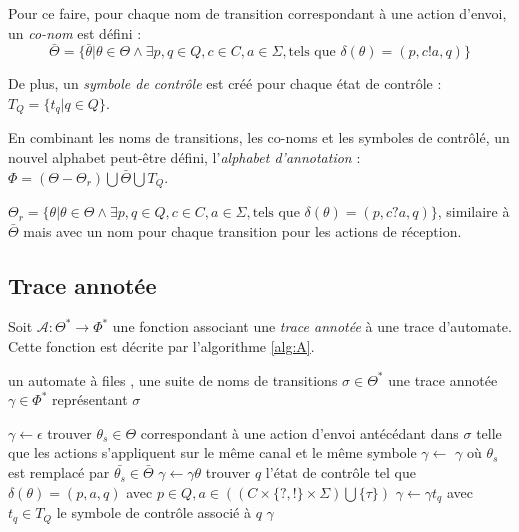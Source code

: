 Pour ce faire, pour chaque nom de transition correspondant à une action d'envoi, un \emph{co-nom} est défini :
$$
\bar{\Theta}=\{\bar{\theta}|\theta\in\Theta\wedge\exists p,q \in Q, c\in C, a\in\Sigma,\text{tels que } \delta(\theta)=(p,c!a,q)\}
$$

De plus, un \emph{symbole de contrôle} est créé pour chaque état de contrôle : $T_Q = \{t_q | q\in Q\}$.

En combinant les noms de transitions, les co-noms et les symboles de contrôlé, un nouvel alphabet peut-être défini, l'\emph{alphabet d'annotation} : $\Phi=(\Theta-\Theta_r)\bigcup\bar{\Theta}\bigcup T_Q$.

$\Theta_r=\{\theta|\theta\in\Theta\wedge\exists p,q \in Q, c\in C, a\in\Sigma,\text{tels que } \delta(\theta)=(p,c?a,q)\}$, similaire à $\bar{\Theta}$ mais avec un nom pour chaque transition pour les actions de réception.


\subsection{Trace annotée}


Soit $\mathcal{A}:\Theta^*\rightarrow\Phi^*$ une fonction associant une \emph{trace annotée} à une trace d'automate. Cette fonction est décrite par l'algorithme \ref{alg:A}.

\begin{algorithm}[H]
  	\begin{algorithmic}[1]
    \REQUIRE un automate à files \fifo , une suite de noms de transitions $\sigma\in\Theta^*$
		\ENSURE une trace annotée $\gamma\in\Phi^*$ représentant $\sigma$

    \STATE $\gamma\leftarrow\epsilon$
        \STATE trouver $\theta_s\in\Theta$ correspondant à une action d'envoi antécédant dans $\sigma$ telle que les actions s'appliquent sur le même canal et le même symbole
        \STATE $\gamma\leftarrow$ $\gamma$ où $\theta_s$ est remplacé par $\bar{\theta_s}\in\bar{\Theta}$ 
        \STATE $\gamma\leftarrow\gamma\theta$
      \ENDIF
    \ENDFOR
    \STATE trouver $q$ l'état de contrôle tel que $\delta(\theta)=(p,a,q)$ avec $p\in Q,a\in((C \times \{?,!\} \times \Sigma) \bigcup \{\tau\})$
    \STATE $\gamma\leftarrow\gamma t_q$ avec $t_q\in T_Q$ le symbole de contrôle associé à $q$
		\RETURN $\gamma$
	\end{algorithmic}
	\caption{$\mathcal{A}:\Theta^*\rightarrow\Phi^*$}\label{alg:A}
\end{algorithm}


